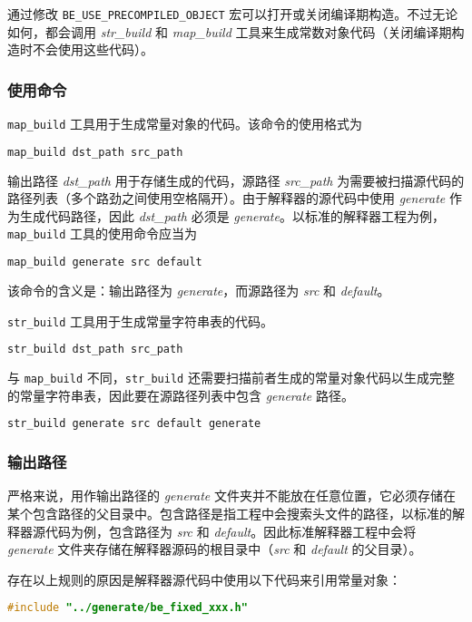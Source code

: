 通过修改 \texttt{BE\_USE\_PRECOMPILED\_OBJECT} 宏可以打开或关闭编译期构造。不过无论如何，都会调用 \textsl{str\_build} 和 \textsl{map\_build} 工具来生成常数对象代码（关闭编译期构造时不会使用这些代码）。

\subsubsection{使用命令}

\texttt{map\_build} 工具用于生成常量对象的代码。该命令的使用格式为
\begin{lstlisting}[language=bash, numbers=none]
map_build dst_path src_path
\end{lstlisting}
输出路径 \textsl{dst\_path} 用于存储生成的代码，源路径 \textsl{src\_path} 为需要被扫描源代码的路径列表（多个路劲之间使用空格隔开）。由于解释器的源代码中使用 \textsl{generate} 作为生成代码路径，因此 \textsl{dst\_path} 必须是 \textsl{generate}。以标准的解释器工程为例，\texttt{map\_build} 工具的使用命令应当为
\begin{lstlisting}[language=bash, numbers=none]
map_build generate src default
\end{lstlisting}
该命令的含义是：输出路径为 \textsl{generate}，而源路径为 \textsl{src} 和 \textsl{default}。

\texttt{str\_build} 工具用于生成常量字符串表的代码。
\begin{lstlisting}[language=bash, numbers=none]
str_build dst_path src_path
\end{lstlisting}
与 \texttt{map\_build} 不同，\texttt{str\_build} 还需要扫描前者生成的常量对象代码以生成完整的常量字符串表，因此要在源路径列表中包含 \textsl{generate} 路径。
\begin{lstlisting}[language=bash, numbers=none]
str_build generate src default generate
\end{lstlisting}

\subsubsection{输出路径}

严格来说，用作输出路径的 \textsl{generate} 文件夹并不能放在任意位置，它必须存储在某个包含路径的父目录中。包含路径是指工程中会搜索头文件的路径，以标准的解释器源代码为例，包含路径为 \textsl{src} 和 \textsl{default}。因此标准解释器工程中会将 \textsl{generate} 文件夹存储在解释器源码的根目录中（\textsl{src} 和 \textsl{default} 的父目录）。

存在以上规则的原因是解释器源代码中使用以下代码来引用常量对象：
\begin{lstlisting}[language=c, numbers=none]
#include "../generate/be_fixed_xxx.h"
\end{lstlisting}

